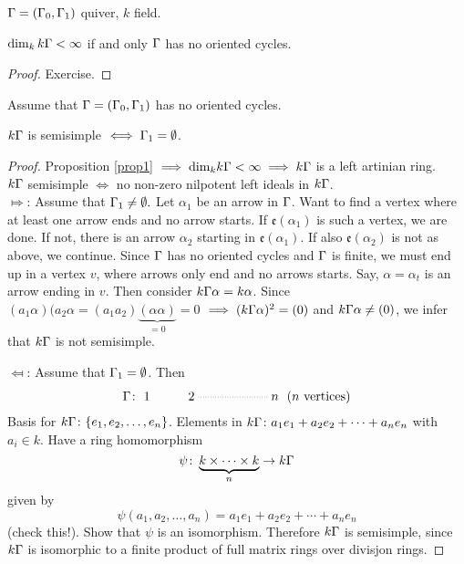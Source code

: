 \begin{prop}\label{prop1}
  $\Gamma = (\Gamma_0,\Gamma_1)$ quiver, $k$ field.
\begin{center}
  $\dim_kk\Gamma < \infty$ if and only $\Gamma$ has no oriented cycles.
\end{center}
\end{prop}
\begin{proof}
  Exercise.
\end{proof}

\begin{prop}
  Assume that $\Gamma=(\Gamma_0,\Gamma_1)$ has no oriented cycles. 
\begin{center}
$k\Gamma$ is semisimple $\iff \Gamma_1 = \emptyset$.
\end{center}
\end{prop}

\begin{proof}
  Proposition \ref{prop1} $ \implies \text{dim}_kk\Gamma < \infty \implies k\Gamma$ is a left artinian ring. \\
  $k\Gamma$ semisimple $\iff $ no non-zero nilpotent left ideals in $k\Gamma$.\\

  $\Mapsto$: Assume that $\Gamma_1\neq\emptyset.$ Let $\alpha_1$ be an
  arrow in $\Gamma$. Want to find a vertex where at least one arrow ends
  and no arrow starts. If $\mathfrak{e}(\alpha_1)$ is such a vertex,
  we are done. If not, there is an arrow $\alpha_2$ starting in
  $\mathfrak{e}(\alpha_1)$.  If also $\mathfrak{e}(\alpha_2)$ is not
  as above, we continue. Since $\Gamma$ has no oriented cycles and $\Gamma$ is
  finite, we must end up in a vertex $ v$, where arrows only end and
  no arrows starts. Say, $\alpha = \alpha_t$ is an arrow ending in
  $v$. Then consider $k\Gamma\alpha = k\alpha$.  Since
  $(a_1\alpha)(a_2\alpha = (a_1a_2)\underbrace{(\alpha\alpha)}_{=0} =
  0$ $\implies (k\Gamma\alpha)^2=(0)$ and $k\Gamma\alpha \neq (0)$, we infer
  that $k\Gamma$ is not semisimple.

$\Mapsfrom$: Assume that $\Gamma_1 = \emptyset$. Then 
\[\G\colon \xymatrix{1 & 2\ar@{..}[rr] & &  n} \text{ ($n$ vertices)}\]
  Basis for $k\Gamma\colon \{e_1, e_2, \ldots, e_n\}$. Elements in
  $k\Gamma\colon a_1e_1 + a_2e_2 + \cdots + a_ne_n$ with $a_i \in k$. Have
  a ring homomorphism
\[\psi\colon \underbrace{k \times \cdots \times k}_{n}  \rightarrow k\Gamma\]
  given by
\[\psi(a_1,a_2,\ldots,a_n)=a_1e_1 + a_2e_2+ \cdots + a_ne_n\] 
(check this!).  Show that $\psi$ is an isomorphism. Therefore $k\Gamma$ is
  semisimple, since $k\Gamma$ is isomorphic to a finite product of full
  matrix rings over divisjon rings.
\end{proof}

